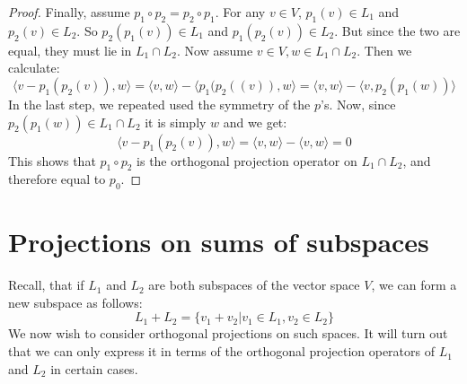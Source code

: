 \documentclass[12pt, a4paper]{article}
\numberwithin{equation}{section}
\begin{document}
\begin{proof}
Finally, assume $p_1\circ p_2=p_2\circ p_1$. For any $v\in V$, $p_1(v)\in L_1$ and $p_2(v)\in L_2$. So $p_2(p_1(v))\in L_1$ and $p_1(p_2(v))\in L_2$. But since the two are equal, they must lie in $L_1\cap L_2$. Now assume $v\in V, w\in L_1\cap L_2$. Then we calculate:
\begin{equation}
\langle v-p_1(p_2(v)),w\rangle=\langle v,w\rangle-\langle p_1(p_2((v)),w\rangle=\langle v,w\rangle-\langle v,p_2(p_1(w))\rangle
\end{equation}
In the last step, we repeated used the symmetry of the $p$'s. Now, since $p_2(p_1(w))\in L_1\cap L_2$ it is simply $w$ and we get:
\begin{equation}
\langle v-p_1(p_2(v)),w\rangle=\langle v,w\rangle-\langle v,w\rangle=0
\end{equation}
This shows that $p_1\circ p_2$ is the orthogonal projection operator on $L_1\cap L_2$, and therefore equal to $p_0$.
\end{proof}

\section{Projections on sums of subspaces}
Recall, that if $L_1$ and $L_2$ are both subspaces of the vector space $V$, we can form a new subspace as follows:
\begin{equation}
L_1+L_2=\{v_1+v_2|v_1\in L_1, v_2\in L_2\}
\end{equation}
We now wish to consider orthogonal projections on such spaces. It will turn out that we can only express it in terms of the orthogonal projection operators of $L_1$ and $L_2$ in certain cases.
\end{document}
